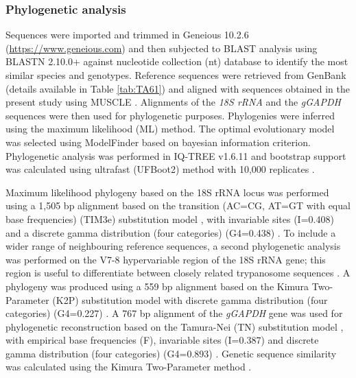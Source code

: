 \documentclass[a4paper, nobind]{templates/ociamthesis}
\begin{document}
\hypertarget{phylogenetic-analysis}{%
\subsubsection{Phylogenetic analysis}\label{phylogenetic-analysis}}

Sequences were imported and trimmed in Geneious 10.2.6 (\url{https://www.geneious.com}) and then subjected to BLAST analysis using BLASTN 2.10.0+ \autocite{zhangGreedyAlgorithmAligning2000} against nucleotide collection (nt) database \autocite{morgulisDatabaseIndexingProduction2008} to identify the most similar species and genotypes. Reference sequences were retrieved from GenBank \autocite{bensonGenBank2017} (details available in Table \ref{tab:TA61}) and aligned with sequences obtained in the present study using MUSCLE \autocite{edgarMUSCLEMultipleSequence2004}. Alignments of the \emph{18S rRNA} and the \emph{gGAPDH} sequences were then used for phylogenetic purposes. Phylogenies were inferred using the maximum likelihood (ML) method. The optimal evolutionary model was selected using ModelFinder \autocite{kalyaanamoorthyModelFinderFastModel2017} based on bayesian information criterion. Phylogenetic analysis was performed in IQ-TREE v1.6.11 \autocite{nguyenIQTREEFastEffective2015} and bootstrap support was calculated using ultrafast (UFBoot2) method with 10,000 replicates \autocite{hoangUFBoot2ImprovingUltrafast2018}.

Maximum likelihood phylogeny based on the 18S rRNA locus was performed using a 1,505 bp alignment based on the transition (AC=CG, AT=GT with equal base frequencies) (TIM3e) substitution model \autocite{posadaUsingMODELTESTPAUP2003}, with invariable sites (I=0.408) and a discrete gamma distribution (four categories) (G4=0.438) \autocite{guMaximumLikelihoodEstimation1995}. To include a wider range of neighbouring reference sequences, a second phylogenetic analysis was performed on the V7-8 hypervariable region of the 18S rRNA gene; this region is useful to differentiate between closely related trypanosome sequences \autocite{hamiltonResolvingRelationshipsAustralian2011}. A phylogeny was produced using a 559 bp alignment based on the Kimura Two-Parameter (K2P) substitution model \autocite{kimuraSimpleMethodEstimating1980} with discrete gamma distribution (four categories) (G4=0.227) \autocite{guMaximumLikelihoodEstimation1995}. A 767 bp alignment of the \emph{gGAPDH} gene was used for phylogenetic reconstruction based on the Tamura-Nei (TN) substitution model \autocite{tamuraEstimationNumberNucleotide1993}, with empirical base frequencies (F), invariable sites (I=0.387) and discrete gamma distribution (four categories) (G4=0.893) \autocite{guMaximumLikelihoodEstimation1995}. Genetic sequence similarity was calculated using the Kimura Two-Parameter method \autocite{tamuraEstimationNumberNucleotide1993}.
\end{document}
